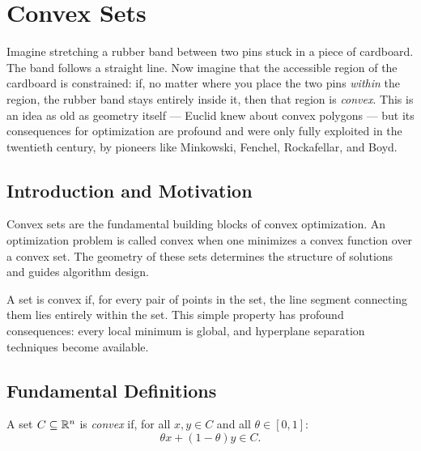 \chapter{Convex Sets}
\label{ch:convex_sets}

Imagine stretching a rubber band between two pins stuck in a piece of
cardboard. The band follows a straight line. Now imagine that the accessible
region of the cardboard is constrained: if, no matter where you place the
two pins \emph{within} the region, the rubber band stays entirely inside it,
then that region is \emph{convex}. This is an idea as old as geometry itself
--- Euclid knew about convex polygons --- but its consequences for
optimization are profound and were only fully exploited in the twentieth
century, by pioneers like Minkowski, Fenchel, Rockafellar, and Boyd.

\section{Introduction and Motivation}

Convex sets are the fundamental building blocks of convex optimization. An optimization
problem is called convex when one minimizes a convex function over a convex set. The
geometry of these sets determines the structure of solutions and guides algorithm design.

\begin{intuition}
A set is convex if, for every pair of points in the set, the line segment connecting
them lies entirely within the set. This simple property has profound consequences:
every local minimum is global, and hyperplane separation techniques become available.
\end{intuition}

\section{Fundamental Definitions}

\begin{definition}
A set $C \subseteq \mathbb{R}^n$ is \emph{convex} if, for all $x, y \in C$ and all
$\theta \in [0,1]$:
\[
    \theta x + (1-\theta)y \in C.
\]
\end{definition}

